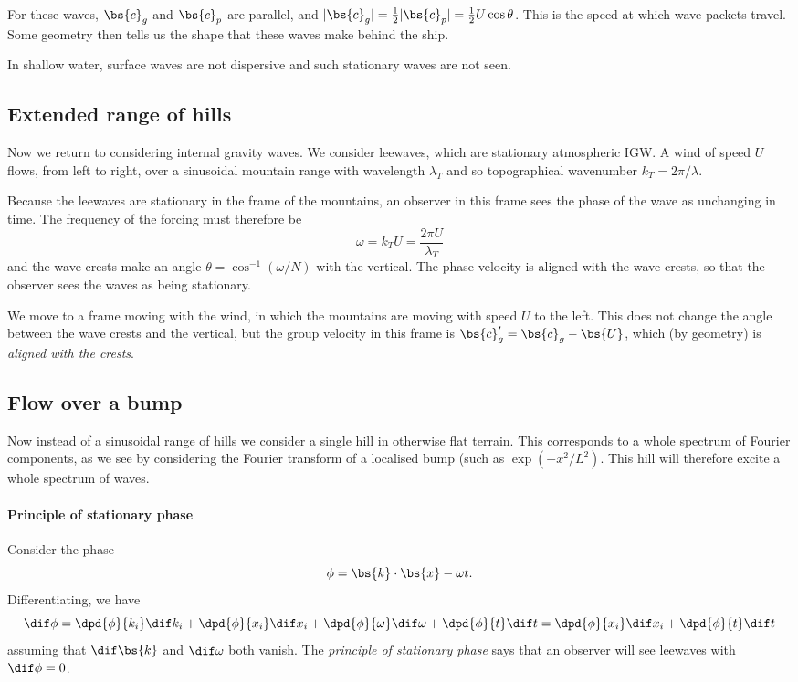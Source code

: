 For these waves, $\bs{c}_g$ and $\bs{c}_p$ are parallel, and $|\bs{c}_g| =
\frac{1}{2} |\bs{c}_p| = \frac{1}{2}U\cos\theta$. This is the speed at which
wave packets travel. Some geometry then tells us the shape that these waves make
behind the ship.

In shallow water, surface waves are not dispersive and such stationary waves are
not seen.

\subsection{Extended range of hills}

Now we return to considering internal gravity waves. We consider leewaves, which
are stationary atmospheric IGW. A wind of speed $U$ flows, from left to right,
over a sinusoidal mountain range with wavelength $\lambda_T$ and so
topographical wavenumber $k_T = 2\pi/\lambda$. 

Because the leewaves are stationary in the frame of the mountains, an observer
in this frame sees the phase of the wave as unchanging in time. The frequency of
the forcing must therefore be
\begin{equation}
	\omega = k_T U = \frac{2\pi U}{\lambda_T}
\end{equation}
and the wave crests make an angle $\theta = \cos^{-1} (\omega/N)$ with the
vertical. The phase velocity is aligned with the wave crests, so that the
observer sees the waves as being stationary.

We move to a frame moving with the wind, in which the mountains are moving with
speed $U$ to the left. This does not change the angle between the wave crests
and the vertical, but the group velocity in this frame is $\bs{c}'_g = \bs{c}_g
- \bs{U}$, which (by geometry) is \textit{aligned with the crests}. 

\subsection{Flow over a bump}

Now instead of a sinusoidal range of hills we consider a single hill in
otherwise flat terrain. This corresponds to a whole spectrum of Fourier
components, as we see by considering the Fourier transform of a localised bump
(such as $\exp(-x^2/L^2)$. This hill will therefore excite a whole spectrum of
waves.

\paragraph{Principle of stationary phase} Consider the phase
\begin{equation}
    \phi = \bs{k}\cdot\bs{x} - \omega t.
\end{equation}
Differentiating, we have
\begin{equation}
    \dif\phi = \dpd{\phi}{k_i} \dif k_i + \dpd{\phi}{x_i} \dif x_i +
    \dpd{\phi}{\omega} \dif \omega + \dpd{\phi}{t} \dif t 
      = \dpd{\phi}{x_i} \dif x_i + \dpd{\phi}{t} \dif t
\end{equation}
assuming that $\dif\bs{k}$ and $\dif\omega$ both vanish. The \textit{principle
of stationary phase} says that an observer will see leewaves with $\dif\phi=0$.

